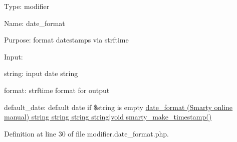 \-Type\-: modifier\par
 \-Name\-: date\-\_\-format\par
 \-Purpose\-: format datestamps via strftime\par
 \-Input\-:\par

\begin{DoxyItemize}
\item string\-: input date string
\item format\-: strftime format for output
\item default\-\_\-date\-: default date if \$string is empty \hyperlink{}{date\-\_\-format (\-Smarty online manual)  string  string  string  string$|$void  smarty\-\_\-make\-\_\-timestamp() }
\end{DoxyItemize}

\-Definition at line 30 of file modifier.\-date\-\_\-format.\-php.


